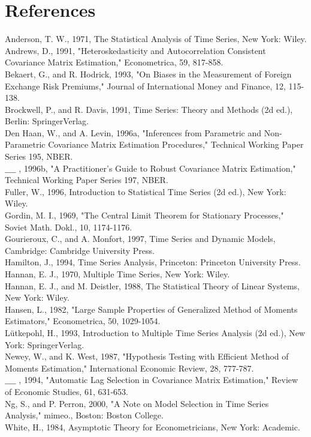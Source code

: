\documentclass[10pt]{article}
\begin{document}
\section*{References}
Anderson, T. W., 1971, The Statistical Analysis of Time Series, New York: Wiley.\\
Andrews, D., 1991, "Heteroskedasticity and Autocorrelation Consistent Covariance Matrix Estimation," Econometrica, 59, 817-858.\\
Bekaert, G., and R. Hodrick, 1993, "On Biases in the Measurement of Foreign Exchange Risk Premiums," Journal of International Money and Finance, 12, 115-138.\\
Brockwell, P., and R. Davis, 1991, Time Series: Theory and Methods (2d ed.), Berlin: SpringerVerlag.\\
Den Haan, W., and A. Levin, 1996a, "Inferences from Parametric and Non-Parametric Covariance Matrix Estimation Procedures," Technical Working Paper Series 195, NBER.\\
$\_\_\_\_$ , 1996b, "A Practitioner's Guide to Robust Covariance Matrix Estimation," Technical Working Paper Series 197, NBER.\\
Fuller, W., 1996, Introduction to Statistical Time Series (2d ed.), New York: Wiley.\\
Gordin, M. I., 1969, "The Central Limit Theorem for Stationary Processes," Soviet Math. Dokl., 10, 1174-1176.\\
Gourieroux, C., and A. Monfort, 1997, Time Series and Dynamic Models, Cambridge: Cambridge University Press.\\
Hamilton, J., 1994, Time Series Analysis, Princeton: Princeton University Press.\\
Hannan, E. J., 1970, Multiple Time Series, New York: Wiley.\\
Hannan, E. J., and M. Deistler, 1988, The Statistical Theory of Linear Systems, New York: Wiley.\\
Hansen, L., 1982, "Large Sample Properties of Generalized Method of Moments Estimators," Econometrica, 50, 1029-1054.\\
Lütkepohl, H., 1993, Introduction to Multiple Time Series Analysis (2d ed.), New York: SpringerVerlag.\\
Newey, W., and K. West, 1987, "Hypothesis Testing with Efficient Method of Moments Estimation," International Economic Review, 28, 777-787.\\
$\_\_\_\_$ , 1994, "Automatic Lag Selection in Covariance Matrix Estimation," Review of Economic Studies, 61, 631-653.\\
Ng, S., and P. Perron, 2000, "A Note on Model Selection in Time Series Analysis," mimeo., Boston: Boston College.\\
White, H., 1984, Asymptotic Theory for Econometricians, New York: Academic.
\end{document}
